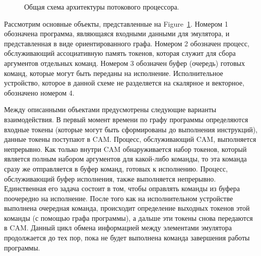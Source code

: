 \documentclass[
11pt,%
tightenlines,%
twoside,%
onecolumn,%
nofloats,%
nobibnotes,%
nofootinbib,%
superscriptaddress,%
noshowpacs,%
centertags]%
{revtex4}
\begin{document}
\begin{figure}[h!]
\setcaptionmargin{5mm}
\onelinecaptionsfalse
{}
\caption{Общая схема архитектуры потокового процессора.}
\label{fig:big-scheme}
\end{figure}

Рассмотрим основные объекты, представленные на Figure~\ref{fig:big-scheme}.
Номером 1 обозначена программа, являющаяся входными данными для эмулятора, и представленная в виде ориентированного графа.
Номером 2 обозначен процесс, обслуживающий ассоциативную память токенов, которая служит для сбора аргументов отдельных команд.
Номером 3 обозначен буфер (очередь) готовых команд, которые могут быть переданы на исполнение.
Исполнительное устройство, которое в данной схеме не разделяется на скалярное и векторное, обозначено номером 4.

Между описанными объектами предусмотрены следующие варианты взаимодействия.
В первый момент времени по графу программы определяются входные токены (которые могут быть сформированы до выполнения инструкций), данные токены поступают в CAM.
Процесс, обслуживающий CAM, выполняется непрерывно.
Как только внутри CAM обнаруживается набор токенов, который является полным набором аргументов для какой-либо команды, то эта команда сразу же отправляется в буфер команд, готовых к исполнению.
Процесс, обслуживающий буфер исполнения, также выполняется непрерывно.
Единственная его задача состоит в том, чтобы оправлять команды из буфера поочередно на исполнение.
После того как на исполнительном устройстве выполнена очередная команда, происходит определение выходных токенов этой команды (с помощью графа программы), а дальше эти токены снова передаются в CAM.
Данный цикл обмена информацией между элементами эмулятора продолжается до тех пор, пока не будет выполнена команда завершения работы программы.
\end{document}
